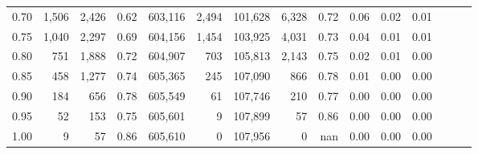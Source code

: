 \begin{tabular}{rrrrrrrrrrrrrrr}
0.70 &    1,506 &   2,426 &  0.62 &  603,116 &    2,494 &  101,628 &    6,328 &  0.72 &  0.06 &  0.02 &      0.01 \\
0.75 &    1,040 &   2,297 &  0.69 &  604,156 &    1,454 &  103,925 &    4,031 &  0.73 &  0.04 &  0.01 &      0.01 \\
0.80 &      751 &   1,888 &  0.72 &  604,907 &      703 &  105,813 &    2,143 &  0.75 &  0.02 &  0.01 &      0.00 \\
0.85 &      458 &   1,277 &  0.74 &  605,365 &      245 &  107,090 &      866 &  0.78 &  0.01 &  0.00 &      0.00 \\
0.90 &      184 &     656 &  0.78 &  605,549 &       61 &  107,746 &      210 &  0.77 &  0.00 &  0.00 &      0.00 \\
0.95 &       52 &     153 &  0.75 &  605,601 &        9 &  107,899 &       57 &  0.86 &  0.00 &  0.00 &      0.00 \\
1.00 &        9 &      57 &  0.86 &  605,610 &        0 &  107,956 &        0 &   nan &  0.00 &  0.00 &      0.00 \\
\bottomrule
\end{tabular}
